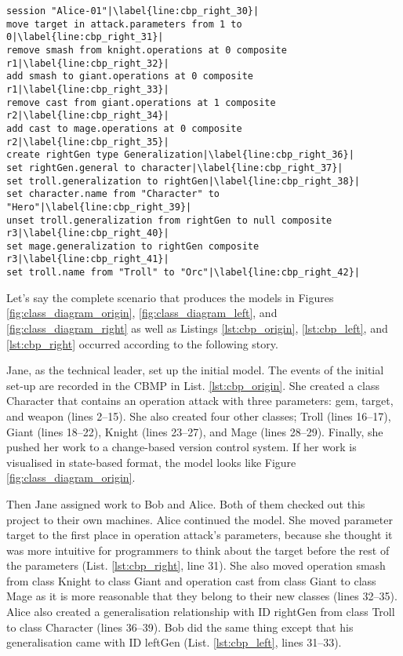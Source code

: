 \vspace{-20pt}
\begin{lstlisting}[firstnumber=30,style=eol,escapechar=|,caption={The appended events made by Alice to produce Figure \ref{fig:class_diagram_right}.},label=lst:cbp_right]
session "Alice-01"|\label{line:cbp_right_30}|
move target in attack.parameters from 1 to 0|\label{line:cbp_right_31}|
remove smash from knight.operations at 0 composite r1|\label{line:cbp_right_32}|
add smash to giant.operations at 0 composite r1|\label{line:cbp_right_33}|
remove cast from giant.operations at 1 composite r2|\label{line:cbp_right_34}|
add cast to mage.operations at 0 composite r2|\label{line:cbp_right_35}|
create rightGen type Generalization|\label{line:cbp_right_36}|
set rightGen.general to character|\label{line:cbp_right_37}|
set troll.generalization to rightGen|\label{line:cbp_right_38}|
set character.name from "Character" to "Hero"|\label{line:cbp_right_39}|
unset troll.generalization from rightGen to null composite r3|\label{line:cbp_right_40}|
set mage.generalization to rightGen composite r3|\label{line:cbp_right_41}|
set troll.name from "Troll" to "Orc"|\label{line:cbp_right_42}|
\end{lstlisting}

Let’s say the complete scenario that produces the models in Figures \ref{fig:class_diagram_origin}, \ref{fig:class_diagram_left}, and \ref{fig:class_diagram_right} as well as Listings \ref{lst:cbp_origin}, \ref{lst:cbp_left}, and \ref{lst:cbp_right} occurred according to the following story.

Jane, as the technical leader, set up the initial model. The events of the initial set-up are recorded in the CBMP in List. \ref{lst:cbp_origin}. She created a class \textsf{Character} that contains an operation \textsf{attack} with three parameters: \textsf{gem}, \textsf{target}, and \textsf{weapon} (lines 2–15). She also created four other classes; \textsf{Troll} (lines 16–17), \textsf{Giant} (lines 18–22), \textsf{Knight} (lines 23–27), and \textsf{Mage} (lines 28–29). Finally, she pushed her work to a change-based version control system. If her work is visualised in state-based format, the model looks like Figure \ref{fig:class_diagram_origin}.

Then Jane assigned work to Bob and Alice. Both of them checked out this project to their own machines. Alice continued the model. She moved parameter \textsf{target} to the first place in operation \textsf{attack}’s parameters, because she thought it was more intuitive for programmers to think about the \textsf{target} before the rest of the parameters (List. \ref{lst:cbp_right}, line 31). She also moved operation \textsf{smash} from class \textsf{Knight} to class \textsf{Giant} and operation \textsf{cast} from class \textsf{Giant} to class \textsf{Mage} as it is more reasonable that they belong to their new classes (lines 32–35). Alice also created a generalisation relationship with ID \textsf{rightGen} from class \textsf{Troll} to class \textsf{Character} (lines 36–39). Bob did the same thing except that his generalisation came with ID \textsf{leftGen} (List. \ref{lst:cbp_left}, lines 31–33).

